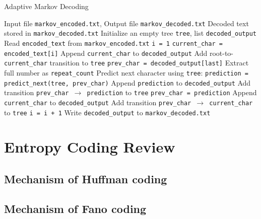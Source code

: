 \documentclass[12pt,twoside]{article}
\begin{document}
\begin{algorithm}
    \caption{Adaptive Markov Decoding}
    \label{alg:markov_decode}
    \begin{algorithmic}[1]
    \REQUIRE Input file \texttt{markov\_encoded.txt}, Output file \texttt{markov\_decoded.txt}
    \ENSURE Decoded text stored in \texttt{markov\_decoded.txt}
    \STATE Initialize an empty tree \texttt{tree}, list \texttt{decoded\_output}
    \STATE Read \texttt{encoded\_text} from \texttt{markov\_encoded.txt}
    \STATE \texttt{i = 1}
        \STATE \texttt{current\_char = encoded\_text[i]}
            \STATE Append \texttt{current\_char} to \texttt{decoded\_output}
            \STATE Add root-to-\texttt{current\_char} transition to \texttt{tree}
        \ELSE
            \STATE \texttt{prev\_char = decoded\_output[last]}
                \STATE Extract full number as \texttt{repeat\_count}
                \STATE Predict next character using \texttt{tree}: \texttt{prediction = predict\_next(tree, prev\_char)}
                    \STATE Append \texttt{prediction} to \texttt{decoded\_output}
                    \STATE Add transition \texttt{prev\_char $\to$ prediction} to \texttt{tree}
                    \STATE \texttt{prev\_char = prediction}
                \ENDFOR
            \ELSE
                \STATE Append \texttt{current\_char} to \texttt{decoded\_output}
                \STATE Add transition \texttt{prev\_char $\to$ current\_char} to \texttt{tree}
            \ENDIF
        \ENDIF
        \STATE \texttt{i = i + 1}
    \ENDWHILE
    \STATE Write \texttt{decoded\_output} to \texttt{markov\_decoded.txt}
    \end{algorithmic}
\end{algorithm}


\section{Entropy Coding Review}

\subsection{Mechanism of Huffman coding}
\label{sec:huffman}


\subsection{Mechanism of Fano coding}
\end{document}
